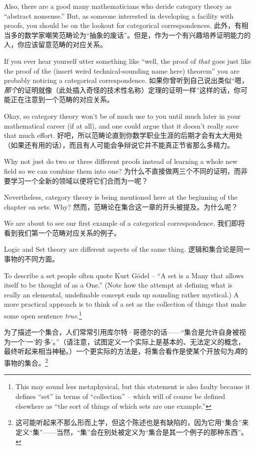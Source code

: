Also, there are 
a good many mathematicians who deride category theory as 
``abstract nonsense.''   But, as someone interested in developing a facility
with proofs, you should be on the lookout for categorical correspondences.
此外，有相当多的数学家嘲笑范畴论为“抽象的废话”。但是，作为一个有兴趣培养证明能力的人，你应该留意范畴的对应关系。

If you ever hear yourself utter something like ``well, the proof of 
\emph{that} goes just like the proof of the 
(insert weird technical-sounding name here) theorem'' you are  
probably noticing a categorical correspondence.
如果你曾听到自己说出类似“嗯，\emph{那个}的证明就像（此处插入奇怪的技术性名称）定理的证明一样”这样的话，你可能正在注意到一个范畴的对应关系。

Okay, so category theory won't be of much
use to you until much later in your mathematical career (if at all), and 
one could argue that it doesn't really save that much effort.
好吧，所以范畴论直到你数学职业生涯的后期才会有太大用处（如果还有用的话），而且有人可能会争辩说它并不能真正节省那么多精力。

Why not just do two or three different 
proofs instead of learning a whole new field so we can combine 
them into one?
为什么不直接做两三个不同的证明，而非要学习一个全新的领域以便将它们合而为一呢？

Nevertheless, category theory is being
mentioned here at the beginning of the chapter on sets.  Why?
然而，范畴论在集合这一章的开头被提及。为什么呢？

We are about to see our first example of a categorical correspondence.
我们即将看到我们第一个范畴对应关系的例子。

Logic and Set theory are different aspects of the same thing.
逻辑和集合论是同一事物的不同方面。

To
describe a set people often quote 
 Kurt G\"{o}del -- 
``A set is a Many that allows itself to be thought of as a One.''  (Note
how the attempt at defining what is really an elemental, undefinable
concept ends up sounding rather mystical.)  A more practical approach is
to think of a set as the collection of things that make some open sentence
\emph{true}.\footnote{This may sound less metaphysical,
but this statement is also faulty because it defines ``set'' in terms of ``collection'' -- which will of course be defined elsewhere as ``the sort of things of which sets are one example.''} 

为了描述一个集合，人们常常引用库尔特·哥德尔的话——“集合是允许自身被视为一个‘一’的‘多’。”（请注意，试图定义一个实际上是基本的、无法定义的概念，最终听起来相当神秘。）一个更实际的方法是，将集合看作是使某个开放句为\emph{真}的事物的集合。\footnote{这可能听起来不那么形而上学，但这个陈述也是有缺陷的，因为它用“集合”来定义“集”——当然，“集”会在别处被定义为“集合是其一个例子的那种东西”。} 

